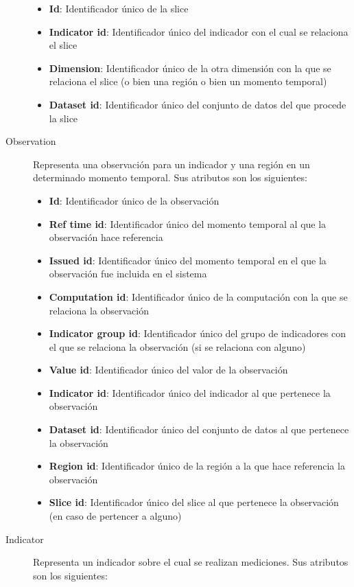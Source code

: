\begin{description}
		\begin{itemize}
			\item \textbf{Id}:  Identificador único de la slice
			\item \textbf{Indicator id}:  Identificador único del indicador con el cual se relaciona el slice
			\item \textbf{Dimension}:  Identificador único de la otra dimensión con la que se relaciona el slice (o bien una región o bien un momento temporal)
			\item \textbf{Dataset id}:  Identificador único del conjunto de datos del que procede la slice
		\end{itemize}
	\item[Observation]  Representa una observación para un indicador y una región en un determinado momento temporal.  Sus atributos son los siguientes:
		\begin{itemize}
			\item \textbf{Id}:  Identificador único de la observación
			\item \textbf{Ref time id}:  Identificador único del momento temporal al que la observación hace referencia
			\item \textbf{Issued id}:  Identificador único del momento temporal en el que la observación fue incluida en el sistema
			\item \textbf{Computation id}:  Identificador único de la computación con la que se relaciona la observación
			\item \textbf{Indicator group id}:  Identificador único del grupo de indicadores con el que se relaciona la observación (si se relaciona con alguno)
			\item \textbf{Value id}:  Identificador único del valor de la observación
			\item \textbf{Indicator id}:  Identificador único del indicador al que pertenece la observación
			\item \textbf{Dataset id}:  Identificador único del conjunto de datos al que pertenece la observación
			\item \textbf{Region id}:  Identificador único de la región a la que hace referencia la observación
			\item \textbf{Slice id}:  Identificador único del slice al que pertenece la observación (en caso de pertencer a alguno)
		\end{itemize}
	\item[Indicator]  Representa un indicador sobre el cual se realizan mediciones.  Sus atributos son los siguientes:

\end{description}
